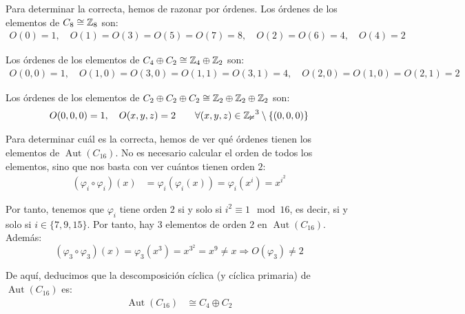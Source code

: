 \documentclass[12pt]{article}
\DeclareMathOperator{\Aut}{Aut}
\begin{document}
\begin{ejercicio}
\begin{enumerate}
            Para determinar la correcta, hemos de razonar por órdenes. Los órdenes de los elementos de $C_8\cong \mathbb{Z}_8$ son:
            \begin{gather*}
                O(0)=1,\quad
                O(1)=O(3)=O(5)=O(7)=8,\quad
                O(2)=O(6)=4,\quad
                O(4)=2
            \end{gather*}

            Los órdenes de los elementos de $C_4\oplus C_2\cong \mathbb{Z}_4\oplus \mathbb{Z}_2$ son:
            \begin{gather*}
                O(0,0)=1,\quad
                O(1,0)=O(3,0)=O(1,1)=O(3,1)=4,\quad
                O(2,0)=O(1,0)=O(2,1)=2
            \end{gather*}

            Los órdenes de los elementos de $C_2\oplus C_2\oplus C_2\cong \mathbb{Z}_2\oplus \mathbb{Z}_2\oplus \mathbb{Z}_2$ son:
            \begin{gather*}
                O(0,0,0)=1,\quad
                O(x,y,z)=2\qquad \forall (x,y,z)\in \mathbb{Z_2}^3\setminus \{(0,0,0)\}
            \end{gather*}

            Para determinar cuál es la correcta, hemos de ver qué órdenes tienen los elementos de $\Aut(C_{16})$. No es necesario calcular el orden de todos los elementos, sino que nos basta con ver cuántos tienen orden $2$:
            \begin{align*}
                (\varphi_i \circ \varphi_i)(x) & = \varphi_i(\varphi_i(x)) = \varphi_i(x^i) = x^{i^2}
            \end{align*}

            Por tanto, tenemos que $\varphi_i$ tiene orden $2$ si y solo si $i^2 \equiv 1 \mod 16$, es decir, si y solo si $i\in \{7,9,15\}$. Por tanto, hay $3$ elementos de orden $2$ en $\Aut(C_{16})$. Además:
            \begin{equation*}
                (\varphi_3\circ \varphi_3)(x) = \varphi_3(x^3) = x^{3^2} = x^9\neq x
                \Longrightarrow O(\varphi_3)\neq 2
            \end{equation*}
            
            De aquí, deducimos que la descomposición cíclica (y cíclica primaria) de $\Aut(C_{16})$ es:
            \begin{align*}
                \Aut(C_{16}) & \cong C_4 \oplus C_2
            \end{align*}

        \end{enumerate}
    \end{ejercicio}
\end{document}
